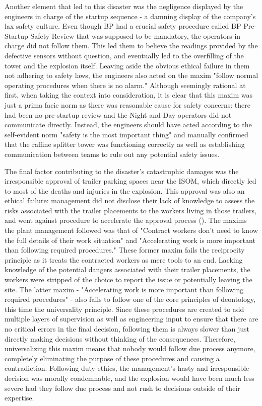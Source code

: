 \documentclass[12pt]{article}
\begin{document}
	Another element that led to this disaster was the negligence displayed by the engineers in charge of the startup sequence - a damning display of the company's lax safety culture. Even though BP had a crucial safety procedure called BP Pre-Startup Safety Review that was supposed to be mandatory, the operators in charge did not follow them. This led them to believe the readings provided by the defective sensors without question, and eventually led to the overfilling of the tower and the explosion itself. Leaving aside the obvious ethical failure in them not adhering to safety laws, the engineers also acted on the maxim "follow normal operating procedures when there is no alarm." Although seemingly rational at first, when taking the context into consideration, it is clear that this maxim was just a prima facie norm as there was reasonable cause for safety concerns: there had been no pre-startup review and the Night and Day operators did not communicate directly. Instead, the engineers should have acted according to the self-evident norm "safety is the most important thing" and manually confirmed that the raffine splitter tower was functioning correctly as well as establishing communication between teams to rule out any potential safety issues.
		
	The final factor contributing to the disaster's catastrophic damages was the irresponsible approval of trailer parking spaces near the ISOM, which directly led to most of the deaths and injuries in the explosion. This approval was also an ethical failure: management did not disclose their lack of knowledge to assess the risks associated with the trailer placements to the workers living in those trailers, and went against procedure to accelerate the approval process (\cite{csbreport}). The maxims the plant management followed was that of "Contract workers don't need to know the full details of their work situation" and "Accelerating work is more important than following required procedures." These former maxim fails the reciprocity principle as it treats the contracted workers as mere tools to an end. Lacking knowledge of the potential dangers associated with their trailer placements, the workers were stripped of the choice to report the issue or potentially leaving the site. The latter maxim - "Accelerating work is more important than following required procedures"  -  also fails to follow one of the core principles of deontology, this time the universality principle. Since these procedures are created to add multiple layers of supervision as well as engineering input to ensure that there are no critical errors in the final decision, following them is always slower than just directly making decisions without thinking of the consequences. Therefore, universalizing this maxim means that nobody would follow due process anymore, completely eliminating the purpose of these procedures and causing a contradiction. Following duty ethics, the management's hasty and irresponsible decision was morally condemnable, and the explosion would have been much less severe had they follow due process and not rush to decisions outside of their expertise.
	
\end{document}
